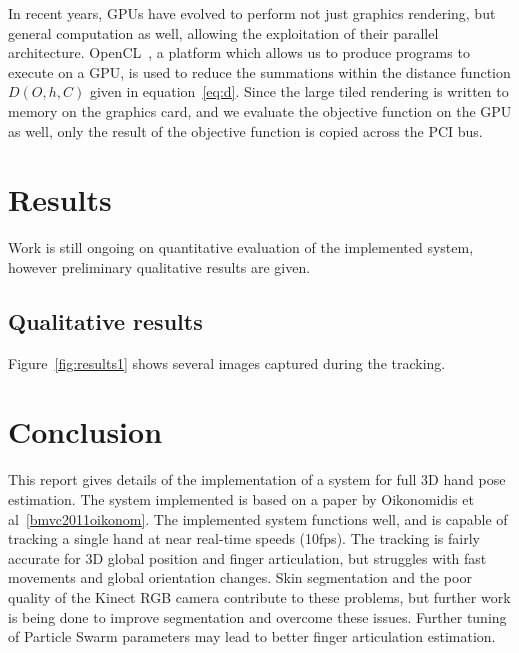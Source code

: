 \documentclass[10pt,a4paper,notitlepage,twocolumn]{report}
\begin{document}
In recent years, GPUs have evolved to perform not just graphics rendering, but
general computation as well, allowing the exploitation of their
parallel architecture.  OpenCL~\cite{opencl1.2spec}, a platform which allows us
to produce programs to execute on a GPU, is used to reduce the summations within
the distance function $D(O, h, C)$ given in equation~\ref{eq:d}.  Since the
large tiled rendering is written to memory on the graphics card, and we evaluate
the objective function on the GPU as well, only the result of the objective 
function is copied across the PCI bus.

\section{Results}

Work is still ongoing on quantitative evaluation of the implemented system,
however preliminary qualitative results are given.

\subsection{Qualitative results}

Figure~\ref{fig:results1} shows several images captured during the tracking.

\section{Conclusion}

This report gives details of the implementation of a system for full 3D hand
pose estimation.  The system implemented is based on a paper by Oikonomidis et
al~\ref{bmvc2011oikonom}.  The implemented system functions well, and is capable
of tracking a single hand at near real-time speeds (10fps).  The tracking is
fairly accurate for 3D global position and finger articulation, but struggles
with fast movements and global orientation changes.  Skin segmentation and the
poor quality of the Kinect RGB camera contribute to these problems, but further
work is being done to improve segmentation and overcome these issues.  Further
tuning of Particle Swarm parameters may lead to better finger articulation
estimation. 



\end{document}
